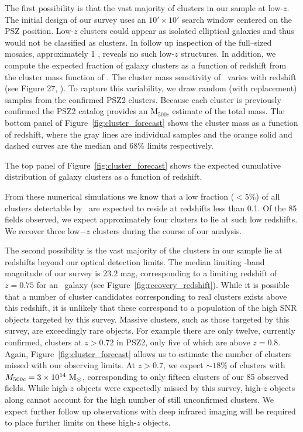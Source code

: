 \documentclass[apj, revtex4-1]{emulateapj}
\begin{document}
The first possibility is that the vast majority of clusters in our sample at low-$z$. The initial design of our survey uses an $10'\times10'$ search window centered on the PSZ position. Low-$z$ clusters could appear as isolated elliptical galaxies and thus would not be classified as clusters. In follow up inspection of the full--sized mosaics, approximately 1 \degsq, reveals no such low-$z$ structures. In addition, we compute the expected fraction of galaxy clusters as a function of redshift from the cluster mass function of \cite{Tinker2008}. The cluster mass sensitivity of \planck\ varies with redshift (see Figure 27, \citealt{PlanckCollaboration2015a}). To capture this variability, we draw random (with replacement) samples from the confirmed PSZ2 clusters. Because each cluster is previously confirmed the PSZ2 catalog provides an M$_{500c}$ estimate of the total mass. The bottom panel of Figure~\ref{fig:cluster_forecast} shows the cluster mass as a function of redshift, where the gray lines are individual samples and the orange solid and dashed curves are the median and 68\% limits respectively.

The top panel of Figure~\ref{fig:cluster_forecast} shows the expected cumulative distribution of galaxy clusters as a function of redshift.

From these numerical simulations we know that a low fraction ($<5\%$) of all clusters detectable by \planck\ are expected to reside at redshifts less than 0.1. Of the 85 fields observed, we expect approximately four clusters to lie at such low redshifts. We recover three low$-z$ clusters during the course of our analysis.

The second possibility is the vast majority of the clusters in our sample lie at redshifts beyond our optical detection limits. The median limiting \sdssi-band magnitude of our survey is $23.2$ mag, corresponding to a limiting redshift of $z=0.75$ for an \mstar\ galaxy (see Figure~\ref{fig:recovery_redshift}). While it is possible that a number of cluster candidates corresponding to real clusters exists above this redshift, it is unlikely that these correspond to a population of the high SNR objects targeted by this survey. Massive clusters, such as those targeted by this survey, are exceedingly rare objects. For example there are only twelve, currently confirmed, clusters at $z>0.72$ in PSZ2, only five of which are above $z=0.8$. Again, Figure~\ref{fig:cluster_forecast} allows us to estimate the number of clusters missed with our observing limits. At $z>0.7$, we expect $\sim18\%$ of clusters with $M_{500c}=3\times10^{14}~\hbox{$\mathrm{M}_\odot$}$, corresponding to only fifteen clusters of our 85 observed fields. While high-$z$ objects were expectedly missed by this survey, high-$z$ objects along cannot account for the high number of still unconfirmed clusters. We expect further follow up observations with deep infrared imaging will be required to place further limits on these high-$z$ objects.
\end{document}
